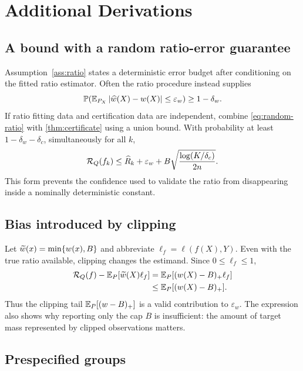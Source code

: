 \section{Additional Derivations}
\label{app:derivations}

\subsection{A bound with a random ratio-error guarantee}

Assumption~\ref{ass:ratio} states a deterministic error budget after conditioning
on the fitted ratio estimator.  Often the ratio procedure instead supplies
\begin{equation}
  \mathbb{P}\!\left(
    \mathbb{E}_{P_X}\left\lvert\widehat w(X)-w(X)\right\rvert\leq\varepsilon_w
  \right)\geq1-\delta_w.
  \label{eq:random-ratio}
\end{equation}
If ratio fitting data and certification data are independent, combine
\cref{eq:random-ratio} with \cref{thm:certificate} using a union bound.  With
probability at least $1-\delta_w-\delta_c$, simultaneously for all $k$,
\begin{equation}
  \mathcal{R}_Q(f_k)\leq \widehat R_k+\varepsilon_w
  +B\sqrt{\frac{\log(K/\delta_c)}{2n}}.
\end{equation}
This form prevents the confidence used to validate the ratio from disappearing
inside a nominally deterministic constant.

\subsection{Bias introduced by clipping}

Let $\widetilde w(x)=\min\{w(x),B\}$ and abbreviate
$\ell_f=\ell(f(X),Y)$.  Even with the true ratio available, clipping changes the
estimand.  Since $0\leq\ell_f\leq1$,
\begin{align}
  \mathcal{R}_Q(f)-\mathbb{E}_P[\widetilde w(X)\ell_f]
  &=\mathbb{E}_P[(w(X)-B)_+\ell_f]\\
  &\leq\mathbb{E}_P[(w(X)-B)_+].
\end{align}
Thus the clipping tail $\mathbb{E}_P[(w-B)_+]$ is a valid contribution to
$\varepsilon_w$.  The expression also shows why reporting only the cap $B$ is
insufficient: the amount of target mass represented by clipped observations
matters.

\subsection{Prespecified groups}

